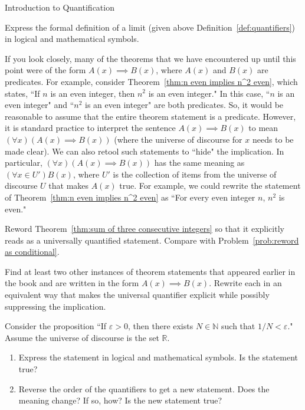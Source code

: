 \begin{section}{Introduction to Quantification}
\begin{problem}
Express the formal definition of a limit (given above Definition~\ref{def:quantifiers}) in logical and mathematical symbols.
\end{problem}

If you look closely, many of the theorems that we have encountered up until this point were of the form $A(x)\implies B(x)$, where $A(x)$ and $B(x)$ are predicates.  For example, consider Theorem~\ref{thm:n even implies n^2 even}, which states, ``If $n$ is an even integer, then $n^2$ is an even integer." In this case, ``$n$ is an even integer" and ``$n^2$ is an even integer" are both predicates.  So, it would be reasonable to assume that the entire theorem statement is a predicate.  However, it is standard practice to interpret the sentence $A(x)\implies B(x)$ to mean $(\forall x)(A(x)\implies B(x))$ (where the universe of discourse for $x$ needs to be made clear). We can also retool such statements to ``hide" the implication. In particular, $(\forall x)(A(x)\implies B(x))$ has the same meaning as $(\forall x \in U')B(x)$, where $U'$ is the collection of items from the universe of discourse $U$ that makes $A(x)$ true. For example, we could rewrite the statement of Theorem~\ref{thm:n even implies n^2 even} as ``For every even integer $n$, $n^2$ is even."

\begin{problem}
Reword Theorem~\ref{thm:sum of three consecutive integers} so that it explicitly reads as a universally quantified statement. Compare with Problem~\ref{prob:reword as conditional}.
\end{problem}

\begin{problem}
Find at least two other instances of theorem statements that appeared earlier in the book and are written in the form $A(x)\implies B(x)$. Rewrite each in an equivalent way that makes the universal quantifier explicit while possibly suppressing the implication.
\end{problem}

\begin{problem}
Consider the proposition ``If $\varepsilon >0$, then there exists $N\in\mathbb{N}$ such that $1/N<\varepsilon$."  Assume the universe of discourse is the set $\mathbb{R}$.
\begin{enumerate}[label=\textrm{(\alph*)}]
\item Express the statement in logical and mathematical symbols. Is the statement true?
\item Reverse the order of the quantifiers to get a new statement. Does the meaning change?  If so, how?  Is the new statement true?
\end{enumerate}
\end{problem}


\end{section}
